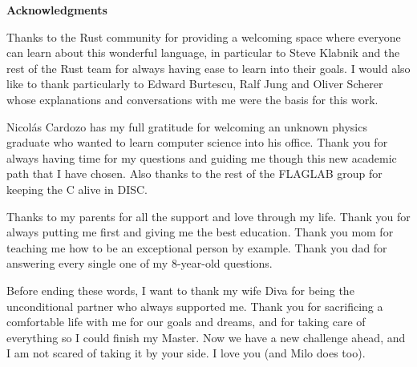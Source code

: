 \clearemptydoublepage
{}
{}

\vspace*{2cm}

\begin{center}
{\Large \textbf{Acknowledgments}}
\end{center}

\vspace{1cm}

Thanks to the Rust community for providing a welcoming space where everyone can
learn about this wonderful language, in particular to Steve Klabnik and the
rest of the Rust team for always having ease to learn into their goals. I would
also like to thank particularly to Edward Burtescu, Ralf Jung and Oliver
Scherer whose explanations and conversations with me were the basis for this
work.

Nicolás Cardozo has my full gratitude for welcoming an unknown physics graduate
who wanted to learn computer science into his office. Thank you for always
having time for my questions and guiding me though this new academic path that
I have chosen. Also thanks to the rest of the FLAGLAB group for keeping the C
alive in DISC.

Thanks to my parents for all the support and love through my life. Thank you
for always putting me first and giving me the best education. Thank you mom for
teaching me how to be an exceptional person by example. Thank you dad for
answering every single one of my 8-year-old questions.

Before ending these words, I want to thank my wife Diva for being the
unconditional partner who always supported me. Thank you for sacrificing a
comfortable life with me for our goals and dreams, and for taking care of
everything so I could finish my Master. Now we have a new challenge ahead, and
I am not scared of taking it by your side. I love you (and Milo does too).

